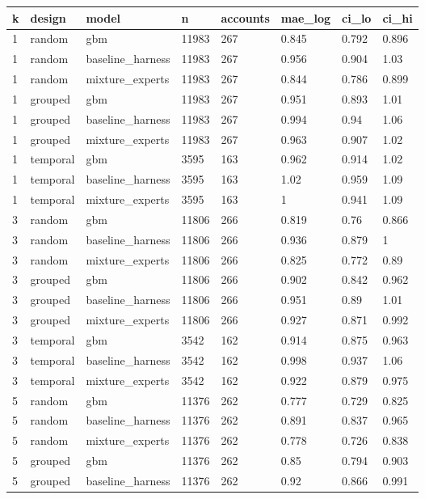 \begin{tabular}{llllllll}
\toprule
k & design & model & n & accounts & mae\_log & ci\_lo & ci\_hi \\
\midrule
1 & random & gbm & 11983 & 267 & 0.845 & 0.792 & 0.896 \\
1 & random & baseline\_harness & 11983 & 267 & 0.956 & 0.904 & 1.03 \\
1 & random & mixture\_experts & 11983 & 267 & 0.844 & 0.786 & 0.899 \\
1 & grouped & gbm & 11983 & 267 & 0.951 & 0.893 & 1.01 \\
1 & grouped & baseline\_harness & 11983 & 267 & 0.994 & 0.94 & 1.06 \\
1 & grouped & mixture\_experts & 11983 & 267 & 0.963 & 0.907 & 1.02 \\
1 & temporal & gbm & 3595 & 163 & 0.962 & 0.914 & 1.02 \\
1 & temporal & baseline\_harness & 3595 & 163 & 1.02 & 0.959 & 1.09 \\
1 & temporal & mixture\_experts & 3595 & 163 & 1 & 0.941 & 1.09 \\
3 & random & gbm & 11806 & 266 & 0.819 & 0.76 & 0.866 \\
3 & random & baseline\_harness & 11806 & 266 & 0.936 & 0.879 & 1 \\
3 & random & mixture\_experts & 11806 & 266 & 0.825 & 0.772 & 0.89 \\
3 & grouped & gbm & 11806 & 266 & 0.902 & 0.842 & 0.962 \\
3 & grouped & baseline\_harness & 11806 & 266 & 0.951 & 0.89 & 1.01 \\
3 & grouped & mixture\_experts & 11806 & 266 & 0.927 & 0.871 & 0.992 \\
3 & temporal & gbm & 3542 & 162 & 0.914 & 0.875 & 0.963 \\
3 & temporal & baseline\_harness & 3542 & 162 & 0.998 & 0.937 & 1.06 \\
3 & temporal & mixture\_experts & 3542 & 162 & 0.922 & 0.879 & 0.975 \\
5 & random & gbm & 11376 & 262 & 0.777 & 0.729 & 0.825 \\
5 & random & baseline\_harness & 11376 & 262 & 0.891 & 0.837 & 0.965 \\
5 & random & mixture\_experts & 11376 & 262 & 0.778 & 0.726 & 0.838 \\
5 & grouped & gbm & 11376 & 262 & 0.85 & 0.794 & 0.903 \\
5 & grouped & baseline\_harness & 11376 & 262 & 0.92 & 0.866 & 0.991 \\

\end{tabular}
